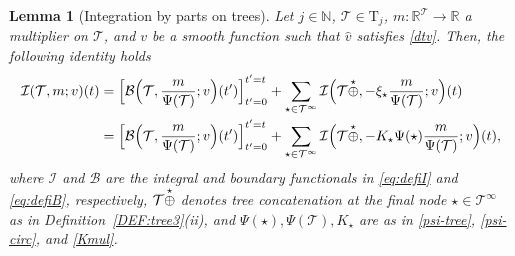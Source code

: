 \documentclass[%
11pt,  reqno]{amsart}
\makeatletter
\newcommand{\5}{\textup{V}}
\newcommand{\ft}{\widehat}
\newtheorem{lemma}[theorem]{Lemma}
\theoremstyle{remark}
\newcommand{\R}{\mathbb{R}}
\newcommand{\TT}{\mathcal{T}}
\newcommand{\Tr}{\mathrm{T}}
\newcommand{\N}{\mathbb{N}}
\def\<#1>{\csname MH@symb@#1\endcsname}
\newcommand{\B}{\mathcal{B}}
\newcommand{\Ical}{\mathcal{I}}
\numberwithin{equation}{section}
\numberwithin{theorem}{section}
\makeatother
\begin{document}
\begin{lemma}[Integration by parts on trees]
\label{LEM:IBP}
Let $j\in\N$, $\TT\in\Tr_j$, $m: \R^{\TT}\to \R$ a multiplier on $\TT$,
and $v$ be a smooth function such that $\ft v$ satisfies  \eqref{dtv}. Then, the following identity holds
\begin{align}\label{IBP}
\begin{split}
\Ical (\TT,m; v)(t) &
= \Big[
\B\Big(\TT,\frac{m}{\Psi(\TT)} ; v \Big)(t')
\Big]_{t'=0}^{t'=t} 
+ \sum_{\star \in \TT^\infty} \Ical 
\Big(\TT \overset{\star}{\oplus} \<1>
, - \xi_\star \frac{m}{\Psi(\TT)} ; v \Big)(t)
\\
&
= \Big[
\B\Big(\TT,\frac{m}{\Psi(\TT)} ; v \Big)(t')
\Big]_{t'=0}^{t'=t} 
+ \sum_{\star \in \TT^\infty} \Ical 
\Big(\TT \overset{\star}{\oplus} \<1>
, - K_\star \Psi(\star) \frac{m}{\Psi(\TT)} ; v \Big)(t)
,
\end{split}
\end{align}
where $\Ical$ and $\B$ are the integral and boundary functionals in \eqref{eq:defiI} and \eqref{eq:defiB}, respectively, $\TT \overset{\star}{\oplus} \<1> $ denotes tree concatenation at the final node $\star\in \TT^\infty$ as in Definition~\ref{DEF:tree3}(ii), and $\Psi(\star), \Psi(\TT), K_\star$ are as in \eqref{psi-tree}, \eqref{psi-circ}, and \eqref{Kmul}.

\end{lemma}
\end{document}
